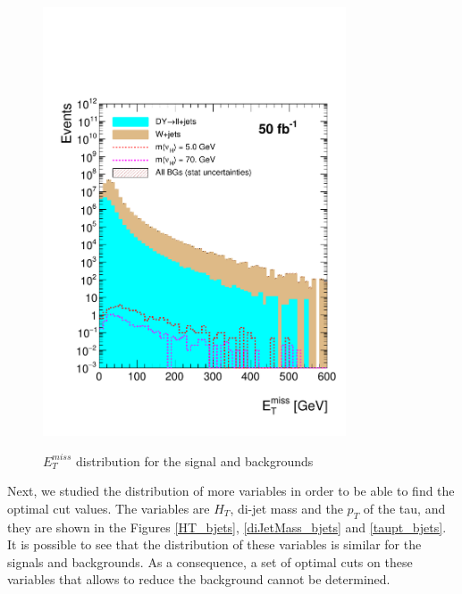  \begin{figure}[h] 
 \centering
 \caption{$E_T^{miss}$ distribution for the signal and backgrounds}
 \includegraphics[width=0.8\textwidth]{./Capitulos/Analysis/AfterBJets/MET_MET_20} 
 \label{MET_bjets}
 \end{figure}
 
Next, we studied the distribution of more variables in order to be able to find the optimal cut values. The variables are $H_T$, di-jet mass and the $p_T$ of the tau, and they are shown in the 
Figures \ref{HT_bjets}, \ref{diJetMass_bjets} and \ref{taupt_bjets}. It is possible to see that the distribution of these variables is similar for the signals and backgrounds. As a consequence, 
a set of optimal cuts on these variables that allows to reduce the background cannot be determined.
 
